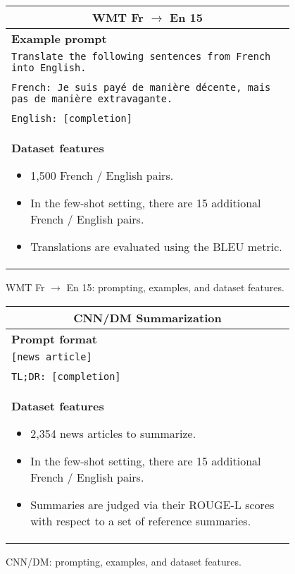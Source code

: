 \begin{figure}[p]
    \centering \small
    \begin{tabular}{p{0.95\linewidth}}
    \toprule
    \multicolumn{1}{c}{\textbf{WMT Fr $\rightarrow$ En 15}} \\

    \midrule
    \textbf{Example prompt}  \\
    \texttt{Translate the following sentences from French into English.} \\\\
    \texttt{French: Je suis payé de manière décente, mais pas de manière extravagante.} \\\\
    \texttt{English: [completion]} \\

    \midrule
    \textbf{Dataset features}
    \begin{itemize}
        \item 1,500 French / English pairs.
        \item In the few-shot setting, there are 15 additional French / English pairs.
        \item Translations are evaluated using the BLEU metric.
    \end{itemize} \\

    \bottomrule
    \end{tabular}
    \caption{WMT Fr $\rightarrow$ En 15: prompting, examples, and dataset features.}
    \label{tab:prompt-wmt}
\end{figure}

\begin{figure}[p]
    \centering \small
    \begin{tabular}{p{0.95\linewidth}}
    \toprule
    \multicolumn{1}{c}{\textbf{CNN/DM Summarization}} \\

    \midrule
    \textbf{Prompt format}  \\
    \texttt{[news article]} \\\\
    \texttt{TL;DR: [completion]} \\

    \midrule
    \textbf{Dataset features}
    \begin{itemize}
        \item 2,354 news articles to summarize.
        \item In the few-shot setting, there are 15 additional French / English pairs.
        \item Summaries are judged via their ROUGE-L scores with respect to a set of reference summaries.
    \end{itemize} \\
    \bottomrule

    \end{tabular}
    \caption{CNN/DM: prompting, examples, and dataset features.}
    \label{tab:prompt-cnndm}
\end{figure}

